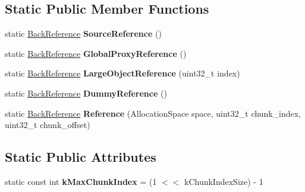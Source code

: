 \subsection*{Static Public Member Functions}
\begin{DoxyCompactItemize}
\item 
static \hyperlink{classv8_1_1internal_1_1_back_reference}{Back\+Reference} {\bfseries Source\+Reference} ()\hypertarget{classv8_1_1internal_1_1_back_reference_a0f08be3c7f48c4538230646b76373430}{}\label{classv8_1_1internal_1_1_back_reference_a0f08be3c7f48c4538230646b76373430}

\item 
static \hyperlink{classv8_1_1internal_1_1_back_reference}{Back\+Reference} {\bfseries Global\+Proxy\+Reference} ()\hypertarget{classv8_1_1internal_1_1_back_reference_a75191ce9b1c832e8341c09ec3609b7a2}{}\label{classv8_1_1internal_1_1_back_reference_a75191ce9b1c832e8341c09ec3609b7a2}

\item 
static \hyperlink{classv8_1_1internal_1_1_back_reference}{Back\+Reference} {\bfseries Large\+Object\+Reference} (uint32\+\_\+t index)\hypertarget{classv8_1_1internal_1_1_back_reference_a72d8f9ec03e74258b2f83fcc3a7d6e14}{}\label{classv8_1_1internal_1_1_back_reference_a72d8f9ec03e74258b2f83fcc3a7d6e14}

\item 
static \hyperlink{classv8_1_1internal_1_1_back_reference}{Back\+Reference} {\bfseries Dummy\+Reference} ()\hypertarget{classv8_1_1internal_1_1_back_reference_a8dad99d0cb51900e2e57405b1eae3beb}{}\label{classv8_1_1internal_1_1_back_reference_a8dad99d0cb51900e2e57405b1eae3beb}

\item 
static \hyperlink{classv8_1_1internal_1_1_back_reference}{Back\+Reference} {\bfseries Reference} (Allocation\+Space space, uint32\+\_\+t chunk\+\_\+index, uint32\+\_\+t chunk\+\_\+offset)\hypertarget{classv8_1_1internal_1_1_back_reference_a02344bed308f774e9f3c41f88b48395d}{}\label{classv8_1_1internal_1_1_back_reference_a02344bed308f774e9f3c41f88b48395d}

\end{DoxyCompactItemize}
\subsection*{Static Public Attributes}
\begin{DoxyCompactItemize}
\item 
static const int {\bfseries k\+Max\+Chunk\+Index} = (1 $<$$<$ k\+Chunk\+Index\+Size) -\/ 1\hypertarget{classv8_1_1internal_1_1_back_reference_a4ba013b2fa2a98536aaef7c2a85b4668}{}\label{classv8_1_1internal_1_1_back_reference_a4ba013b2fa2a98536aaef7c2a85b4668}

\end{DoxyCompactItemize}
